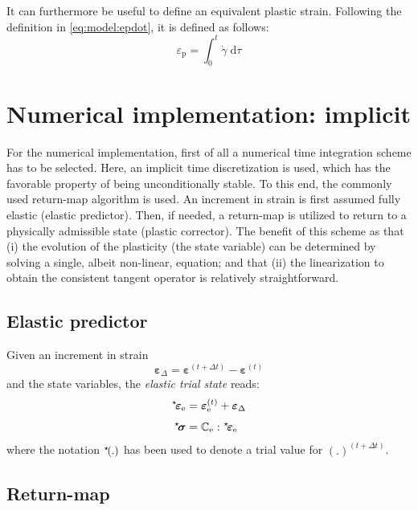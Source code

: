\documentclass[times,namecite]{goose-article}
\newcommand\leftstar[1]{\hspace*{-.3em}~^\star\!#1}
\begin{document}
It can furthermore be useful to define an equivalent plastic strain. Following the definition in \eqref{eq:model:epdot}, it is defined as follows:
\begin{equation}
  \varepsilon_\mathrm{p} = \int_0^t \dot{\gamma} \; \mathrm{d}\tau
\end{equation}

\vfill\newpage
\section{Numerical implementation: implicit}

For the numerical implementation, first of all a numerical time integration scheme has to be selected. Here, an implicit time discretization is used, which has the favorable property of being unconditionally stable. To this end, the commonly used return-map algorithm is used. An increment in strain is first assumed fully elastic (elastic predictor). Then, if needed, a return-map is utilized to return to a physically admissible state (plastic corrector). The benefit of this scheme as that (i) the evolution of the plasticity (the state variable) can be determined by solving a single, albeit non-linear, equation; and that (ii) the linearization to obtain the consistent tangent operator is relatively straightforward.

\subsection{Elastic predictor}

Given an increment in strain
\begin{equation}
  \bm{\varepsilon}_\Delta = \bm{\varepsilon}^{(t + \Delta t)} - \bm{\varepsilon}^{(t)}
  \label{eq:strain-increment}
\end{equation}
and the state variables, the \emph{elastic trial state} reads:
\begin{align}
  \leftstar{\bm{\varepsilon}}_\mathrm{e}
  &=
  \bm{\varepsilon}^{(t)}_\mathrm{e} + \bm{\varepsilon}_\Delta \label{eq:trial-strain}
  \\[1ex]
  \leftstar{\bm{\sigma}}
  &=
  \mathbb{C}_\mathrm{e} : \leftstar{\bm{\varepsilon}}_\mathrm{e}
\end{align}
where the notation $\leftstar{(.)}$ has been used to denote a trial value for $(.)^{(t + \Delta t)}$.

\subsection{Return-map}
\end{document}

